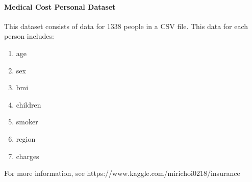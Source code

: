 \documentclass[12pt]{article}
\begin{document}
\paragraph{Medical Cost Personal Dataset}
This dataset consists of data for 1338 people in a CSV file.  This data for each person includes:
\begin{enumerate}
\item age
\item sex
\item bmi
\item children
\item smoker
\item region
\item charges
\end{enumerate}

\noindent
For more information, see https://www.kaggle.com/mirichoi0218/insurance

\newpage
\end{document}
